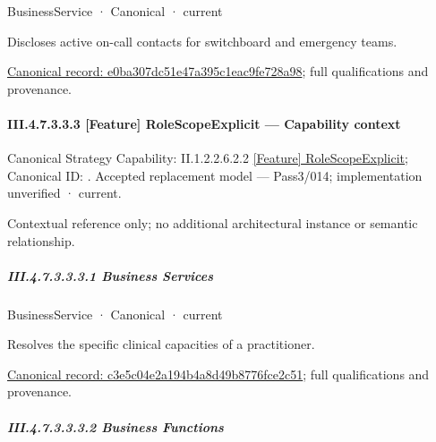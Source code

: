 \label{element:e0ba307dc51e47a395c1eac9fe728a98}
{\small BusinessService · Canonical · current}\par

Discloses active on-call contacts for switchboard and emergency teams.


{\footnotesize \href{../../../../../../../../continuum/business/business-service/e0ba307dc51e47a395c1eac9fe728a98.md}{Canonical record: e0ba307dc51e47a395c1eac9fe728a98}; full qualifications and provenance.}\par
\paragraph*{III.4.7.3.3.3 [Feature] RoleScopeExplicit — Capability context}
\label{navigation:III.4.7.3.3.3}

{\small Canonical Strategy Capability: II.1.2.2.6.2.2 \hyperref[element:1541d71b5c924ed49e618f2496011c81]{[Feature] RoleScopeExplicit}; Canonical ID: \texttt{}. Accepted replacement model — Pass3/014; implementation unverified · current.}\par
Contextual reference only; no additional architectural instance or semantic relationship.\par
\subparagraph*{III.4.7.3.3.3.1 Business Services}
\label{navigation:III.4.7.3.3.3.1}

\label{navigation:III.4.7.3.3.3.1.1}

\label{element:c3e5c04e2a194b4a8d49b8776fce2c51}
{\small BusinessService · Canonical · current}\par

Resolves the specific clinical capacities of a practitioner.


{\footnotesize \href{../../../../../../../../continuum/business/business-service/c3e5c04e2a194b4a8d49b8776fce2c51.md}{Canonical record: c3e5c04e2a194b4a8d49b8776fce2c51}; full qualifications and provenance.}\par
\subparagraph*{III.4.7.3.3.3.2 Business Functions}
\label{navigation:III.4.7.3.3.3.2}

